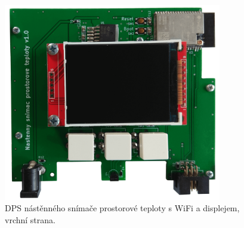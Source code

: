 \begin{figure}[H]
    \centering
    \includegraphics[width=0.85\textwidth]{images/nastenny-snimac-prostorove-teploty-wifi/dps-nastenny-snimac-prostorove-teploty-wifi-vrchni-cast-displej.png}
    \caption{DPS nástěnného snímače prostorové teploty s WiFi a displejem, vrchní strana.}
    \label{fig:dps-nastenny-snimac-prostorove-teploty-wifi-vrchni-cast-displej}
\end{figure}






